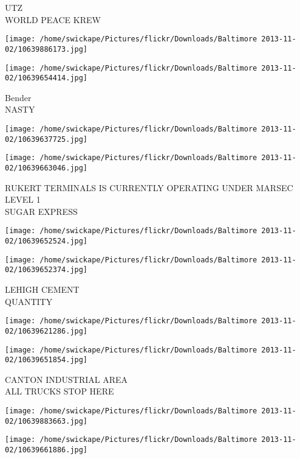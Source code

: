 \documentclass[10pt,letterpaper]{article}
\begin{document}
UTZ\\
WORLD PEACE KREW\\
\pagebreak

\texttt{[image: /home/swickape/Pictures/flickr/Downloads/Baltimore 2013-11-02/10639886173.jpg]}

\vspace{0.25in}
\texttt{[image: /home/swickape/Pictures/flickr/Downloads/Baltimore 2013-11-02/10639654414.jpg]}

Bender\\
NASTY\\
\pagebreak

\texttt{[image: /home/swickape/Pictures/flickr/Downloads/Baltimore 2013-11-02/10639637725.jpg]}

\vspace{0.25in}
\texttt{[image: /home/swickape/Pictures/flickr/Downloads/Baltimore 2013-11-02/10639663046.jpg]}

RUKERT TERMINALS IS CURRENTLY OPERATING UNDER MARSEC LEVEL 1\\
SUGAR EXPRESS\\
\pagebreak

\texttt{[image: /home/swickape/Pictures/flickr/Downloads/Baltimore 2013-11-02/10639652524.jpg]}

\vspace{0.25in}
\texttt{[image: /home/swickape/Pictures/flickr/Downloads/Baltimore 2013-11-02/10639652374.jpg]}

LEHIGH CEMENT\\
QUANTITY\\
\pagebreak

\texttt{[image: /home/swickape/Pictures/flickr/Downloads/Baltimore 2013-11-02/10639621286.jpg]}

\vspace{0.25in}
\texttt{[image: /home/swickape/Pictures/flickr/Downloads/Baltimore 2013-11-02/10639651854.jpg]}

CANTON INDUSTRIAL AREA\\
ALL TRUCKS STOP HERE\\
\pagebreak

\texttt{[image: /home/swickape/Pictures/flickr/Downloads/Baltimore 2013-11-02/10639883663.jpg]}

\vspace{0.25in}
\texttt{[image: /home/swickape/Pictures/flickr/Downloads/Baltimore 2013-11-02/10639661886.jpg]}
\end{document}
